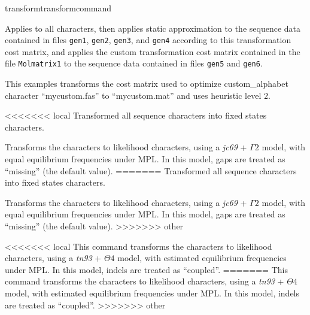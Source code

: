 \begin{command}{transform}{transformcommand}
\begin{poyexamples}
            {Applies  to all characters, then applies
            static approximation to the sequence data contained in files \texttt{gen1}, \texttt{gen2},
            \texttt{gen3}, and \texttt{gen4} according to this transformation cost
            matrix, and applies the custom transformation cost matrix contained in the file
            \texttt{Molmatrix1} to the sequence data contained in files \texttt{gen5} and
            \texttt{gen6}.}
         
            {This examples transforms the cost matrix used to optimize custom\_alphabet 
            character ``mycustom.fas'' to ``mycustom.mat'' and uses heuristic level $2$.}
         
<<<<<<< local
        		 {Transformed all sequence characters into fixed states characters.}
		 
		 {Transforms the characters to  likelihood characters, using a \emph{jc69} + $\Gamma 2$ model, 
		 with equal equilibrium frequencies under MPL. In this model, gaps are treated as ``missing'' (the default value).}
=======
            {Transformed all sequence characters into fixed states characters.}
         
            {Transforms the characters to  likelihood characters, using a \emph{jc69} + $\Gamma 2$ model, 
            with equal equilibrium frequencies under MPL. In this model, gaps are treated as ``missing'' (the default value).}
>>>>>>> other

<<<<<<< local
		 {This command transforms the characters to likelihood characters, using a \emph{tn93} + $\Theta 4$ model, 
		 with estimated equilibrium frequencies under MPL. In this model, indels are treated as ``coupled''.}
=======
            {This command transforms the characters to likelihood characters, using a \emph{tn93} + $\Theta 4$ model, 
            with estimated equilibrium frequencies under MPL. In this model, indels are treated as ``coupled''.}
>>>>>>> other


\end{poyexamples}
\end{command}
